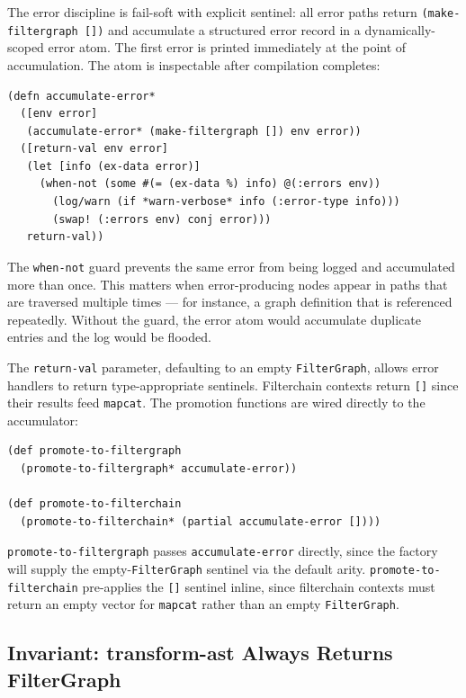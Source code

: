 \documentclass[conference]{IEEEtran}
\begin{document}
The error discipline is fail-soft with explicit sentinel: all error paths return \texttt{(make-filtergraph [])} and accumulate a structured error record in a dynamically-scoped error atom. The first error is printed immediately at the point of accumulation. The atom is inspectable after compilation completes:

\begin{lstlisting}[caption={Error accumulation with deduplication}]
(defn accumulate-error*
  ([env error]
   (accumulate-error* (make-filtergraph []) env error))
  ([return-val env error]
   (let [info (ex-data error)]
     (when-not (some #(= (ex-data %) info) @(:errors env))
       (log/warn (if *warn-verbose* info (:error-type info)))
       (swap! (:errors env) conj error)))
   return-val))
\end{lstlisting}

The \texttt{when-not} guard prevents the same error from being logged and accumulated more than once. This matters when error-producing nodes appear in paths that are traversed multiple times --- for instance, a graph definition that is referenced repeatedly. Without the guard, the error atom would accumulate duplicate entries and the log would be flooded.

The \texttt{return-val} parameter, defaulting to an empty \texttt{FilterGraph}, allows error handlers to return type-appropriate sentinels. Filterchain contexts return \texttt{[]} since their results feed \texttt{mapcat}. The promotion functions are wired directly to the accumulator:

\begin{lstlisting}[caption={Direct wiring of promotion functions to error handler}]
(def promote-to-filtergraph
  (promote-to-filtergraph* accumulate-error))

(def promote-to-filterchain
  (promote-to-filterchain* (partial accumulate-error [])))
\end{lstlisting}

\texttt{promote-to-filtergraph} passes \texttt{accumulate-error} directly, since the factory will supply the empty-\texttt{FilterGraph} sentinel via the default arity. \texttt{promote-to-filterchain} pre-applies the \texttt{[]} sentinel inline, since filterchain contexts must return an empty vector for \texttt{mapcat} rather than an empty \texttt{FilterGraph}.

\subsection{Invariant: transform-ast Always Returns FilterGraph}
\end{document}
